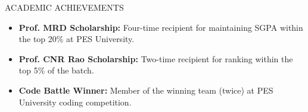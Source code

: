 \documentclass{resume}
\begin{document}
\begin{rSection}{ACADEMIC ACHIEVEMENTS}
\begin{itemize}
    \item \textbf{Prof. MRD Scholarship:} Four-time recipient for maintaining SGPA within the top 20\% at PES University.
    \item \textbf{Prof. CNR Rao Scholarship:} Two-time recipient for ranking within the top 5\% of the batch.
    \item \textbf{Code Battle Winner:} Member of the winning team (twice) at PES University coding competition.
\end{itemize}
\end{rSection}
\end{document}
